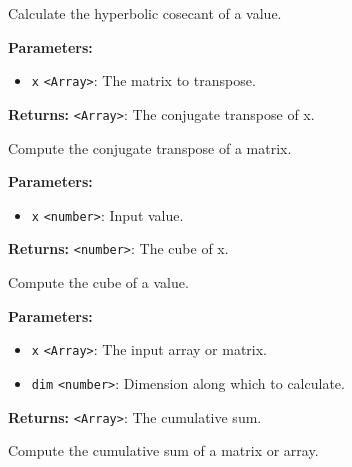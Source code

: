 \documentclass[12pt,a4paper]{article}
\begin{document}
\noindent Calculate the hyperbolic cosecant of a value.

\vspace{5mm}
\noindent {}


\noindent \textbf{Parameters:}
\begin{itemize}
  \item \texttt{x} \texttt{<Array>}: The matrix to transpose.
\end{itemize}

\noindent \textbf{Returns:} \texttt{<Array>}: The conjugate transpose of x.

\noindent Compute the conjugate transpose of a matrix.

\vspace{5mm}
\noindent {}


\noindent \textbf{Parameters:}
\begin{itemize}
  \item \texttt{x} \texttt{<number>}: Input value.
\end{itemize}

\noindent \textbf{Returns:} \texttt{<number>}: The cube of x.

\noindent Compute the cube of a value.

\vspace{5mm}
\noindent {}


\noindent \textbf{Parameters:}
\begin{itemize}
  \item \texttt{x} \texttt{<Array>}: The input array or matrix.
  \item \texttt{dim} \texttt{<number>}: Dimension along which to calculate.
\end{itemize}

\noindent \textbf{Returns:} \texttt{<Array>}: The cumulative sum.

\noindent Compute the cumulative sum of a matrix or array.

\vspace{5mm}
\noindent {}
\end{document}
